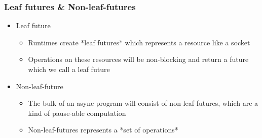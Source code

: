 \begin{frame}[fragile]
    \frametitle{Leaf futures \& Non-leaf-futures}
% 
% 
% 
    \begin{itemize}
        \item Leaf future
    	\begin{itemize}
    	    \item Runtimes create *leaf futures* which represents a resource like a socket
    	    \item Operations on these resources will be non-blocking and return a future which we call a leaf future
    	\end{itemize}

        \item Non-leaf-future
    	\begin{itemize}
    	    \item The bulk of an async program will consist of non-leaf-futures, which are a kind of pause-able computation
    	    \item Non-leaf-futures represents a *set of operations*
    	\end{itemize}
    \end{itemize}
% 
% 
\end{frame}
